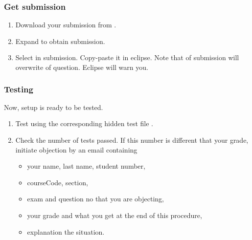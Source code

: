\subsubsection{Get submission}
\begin{enumerate}
	
	\item Download your submission  from \YULearn.
	\item Expand  to obtain submission.
	
	\item Select  in submission. 
	Copy-paste it in eclipse. 
	Note that  of submission will overwrite  of question. 
	Eclipse will warn you.
	
\end{enumerate}




\subsubsection{Testing}

Now, setup is ready to be tested.

\begin{enumerate}
	
	\item Test  using the corresponding hidden test file .

	\item Check the number of tests passed. 
	If this number is different that your grade, 
	initiate objection by an email containing
	\begin{itemize}[nosep] 
		
		\item your name, last name, student number,
		\item courseCode, section,
		\item exam and question no that you are objecting,
		\item your grade and what you get at the end of this procedure,
		\item explanation the situation.
	\end{itemize}

	
\end{enumerate}

